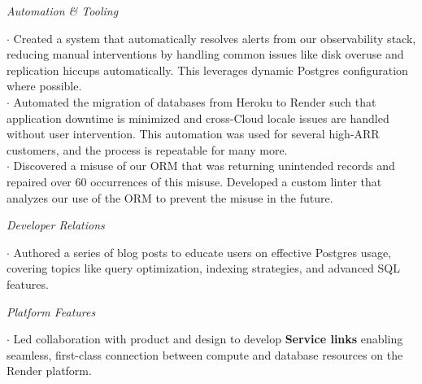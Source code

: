 \documentclass[]{clean-resume}
\begin{document}
{    \textit{Automation \& Tooling}
    \begin{addmargin}[1em]{0em}
      \phantom{~~}\hspace{-1em}$\cdot$ Created a system that automatically resolves alerts from our observability stack, reducing manual interventions by handling common issues like disk overuse and replication hiccups automatically. This leverages dynamic Postgres configuration where possible. \\
      \phantom{~~}\hspace{-1em}$\cdot$ Automated the migration of databases from Heroku to Render such that application downtime is minimized and cross-Cloud locale issues are handled without user intervention. This automation was used for several high-ARR customers, and the process is repeatable for many more. \\
      \phantom{~~}\hspace{-1em}$\cdot$ Discovered a misuse of our ORM that was returning unintended records and repaired over 60 occurrences of this misuse. Developed a custom linter that analyzes our use of the ORM to prevent the misuse in the future.
    \end{addmargin}

    \textit{Developer Relations}
    \begin{addmargin}[1em]{0em}
      \phantom{~~}\hspace{-1em}$\cdot$ Authored a series of blog posts to educate users on effective Postgres usage, covering topics like query optimization, indexing strategies, and advanced SQL features.
    \end{addmargin}

    \textit{Platform Features}
    \begin{addmargin}[1em]{0em}
      \phantom{~~}\hspace{-1em}$\cdot$ Led collaboration with product and design to develop \textbf{Service links} enabling seamless, first-class connection between compute and database resources on the Render platform.
    \end{addmargin}
  }
\end{document}

